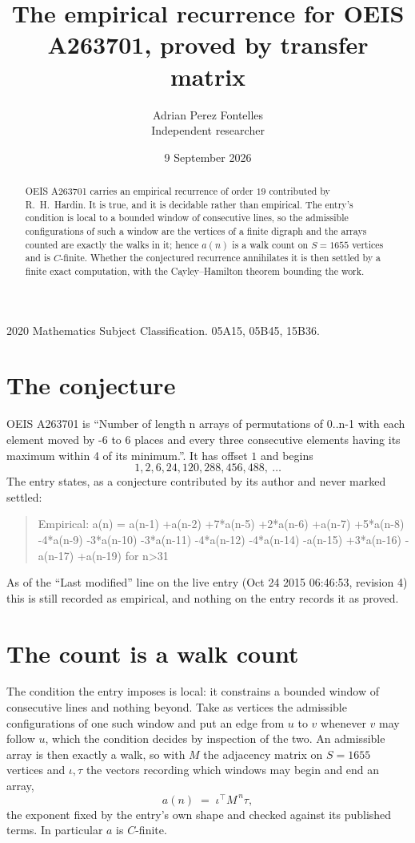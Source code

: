 \documentclass[11pt,a4paper]{article}
\title{The empirical recurrence for OEIS A263701, proved by transfer matrix}
\author{Adrian Perez Fontelles\\ \small Independent researcher}
\date{9 September 2026}
\theoremstyle{plain}
\theoremstyle{definition}
\begin{document}
\maketitle

\begin{abstract}
OEIS A263701 carries an empirical recurrence of order $19$ contributed by R.~H.~Hardin. It is
true, and it is decidable rather than empirical. The entry's condition is local to a bounded window of consecutive lines, so
the admissible configurations of such a window are the vertices of a finite digraph and the
arrays counted are exactly the walks in it; hence $a(n)$ is a walk count on $S=1655$ vertices
and is $C$-finite. Whether the conjectured recurrence annihilates it is then settled by a
finite exact computation, with the Cayley--Hamilton theorem bounding the work.
\end{abstract}

\noindent\small 2020 Mathematics Subject Classification. 05A15, 05B45, 15B36.\normalsize

\section{The conjecture}

OEIS A263701 is ``Number of length n arrays of permutations of 0..n-1 with each element moved by -6 to 6 places and every three consecutive elements having its maximum within 4 of its minimum.''. It has offset $1$ and begins
\[
1, 2, 6, 24, 120, 288, 456, 488,\ \dots
\]
The entry states, as a conjecture contributed by its author and never marked settled:
\begin{quote}
Empirical: a(n) = a(n-1) +a(n-2) +7*a(n-5) +2*a(n-6) +a(n-7) +5*a(n-8) -4*a(n-9) -3*a(n-10) -3*a(n-11) -4*a(n-12) -4*a(n-14) -a(n-15) +3*a(n-16) -a(n-17) +a(n-19) for n>31
\end{quote}
As of the ``Last modified'' line on the live entry (Oct 24 2015 06:46:53, revision 4) this is still
recorded as empirical, and nothing on the entry records it as proved.

\section{The count is a walk count}

The condition the entry imposes is local: it constrains a bounded window of consecutive lines and nothing beyond. Take as
vertices the admissible configurations of one such window and put an edge from $u$ to $v$
whenever $v$ may follow $u$, which the condition decides by inspection of the two. An
admissible array is then exactly a walk, so with $M$ the adjacency matrix on $S=1655$ vertices
and $\iota,\tau$ the vectors recording which windows may begin and end an array,
\[
a(n)\;=\;\iota^{\!\top}M^{\,n}\tau ,
\]
the exponent fixed by the entry's own shape and checked against its published terms. In
particular $a$ is $C$-finite.
\end{document}
